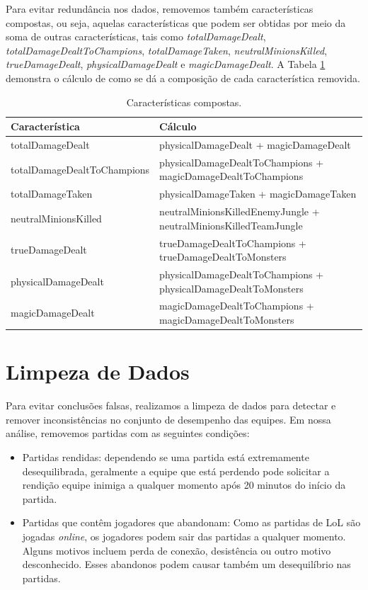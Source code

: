 Para evitar redundância nos dados, removemos também características compostas, ou seja, aquelas características que podem ser obtidas por meio da soma de outras características, tais como \textit{totalDamageDealt}, \textit{totalDamageDealtToChampions}, \textit{totalDamageTaken}, \textit{neutralMinionsKilled}, \textit{trueDamageDealt}, \textit{physicalDamageDealt} e \textit{magicDamageDealt}. A Tabela \ref{tab:compound-features} demonstra o cálculo de como se dá a composição de cada característica removida.

\begin{table}
  \scriptsize
  \caption{Características compostas.}
  \label{tab:compound-features}
  \begin{tabular}{p{}p{}}
    \toprule
    Característica & Cálculo \\
    \midrule
totalDamageDealt & physicalDamageDealt + magicDamageDealt\\
totalDamageDealtToChampions & physicalDamageDealtToChampions + magicDamageDealtToChampions \\
totalDamageTaken & physicalDamageTaken + magicDamageTaken \\
neutralMinionsKilled & neutralMinionsKilledEnemyJungle + neutralMinionsKilledTeamJungle \\
trueDamageDealt & trueDamageDealtToChampions + trueDamageDealtToMonsters \\
physicalDamageDealt & physicalDamageDealtToChampions + physicalDamageDealtToMonsters \\
magicDamageDealt & magicDamageDealtToChampions + magicDamageDealtToMonsters \\
  \bottomrule
\end{tabular}
\end{table}

\section{Limpeza de Dados}
Para evitar conclusões falsas, realizamos a limpeza de dados para detectar e remover inconsistências no conjunto de desempenho das equipes. Em nossa análise, removemos partidas com as seguintes condições:

\begin{itemize}
\item Partidas rendidas: dependendo se uma partida está extremamente desequilibrada, geralmente a equipe que está perdendo pode solicitar a rendição  equipe inimiga a qualquer momento após 20 minutos do início da partida.
\item Partidas que contêm jogadores que abandonam: Como as partidas de LoL são jogadas \textit{online}, os jogadores podem sair das partidas a qualquer momento. Alguns motivos incluem perda de conexão, desistência ou outro motivo desconhecido. Esses abandonos podem causar também um desequilíbrio nas partidas.
\end{itemize}

